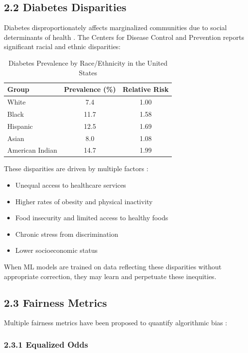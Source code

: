 \documentclass[12pt,a4paper]{article}
\begin{document}
\subsection{2.2 Diabetes Disparities}

Diabetes disproportionately affects marginalized communities due to social 
determinants of health \cite{narayan2017}. The Centers for Disease Control 
and Prevention \cite{cdc2020} reports significant racial and ethnic disparities:

\begin{table}[H]
\centering
\caption{Diabetes Prevalence by Race/Ethnicity in the United States}
\begin{tabular}{lcc}
\toprule
\textbf{Group} & \textbf{Prevalence (\%)} & \textbf{Relative Risk} \\
\midrule
White & 7.4 & 1.00 \\
Black & 11.7 & 1.58 \\
Hispanic & 12.5 & 1.69 \\
Asian & 8.0 & 1.08 \\
American Indian & 14.7 & 1.99 \\
\bottomrule
\end{tabular}
\label{tab:diabetes_disparities}
\end{table}

These disparities are driven by multiple factors \cite{hill2022}:
\begin{itemize}
    \item Unequal access to healthcare services
    \item Higher rates of obesity and physical inactivity
    \item Food insecurity and limited access to healthy foods
    \item Chronic stress from discrimination
    \item Lower socioeconomic status
\end{itemize}

When ML models are trained on data reflecting these disparities without 
appropriate correction, they may learn and perpetuate these inequities.

\subsection{2.3 Fairness Metrics}

Multiple fairness metrics have been proposed to quantify algorithmic bias 
\cite{corbett2018}:

\subsubsection{2.3.1 Equalized Odds}
\end{document}
